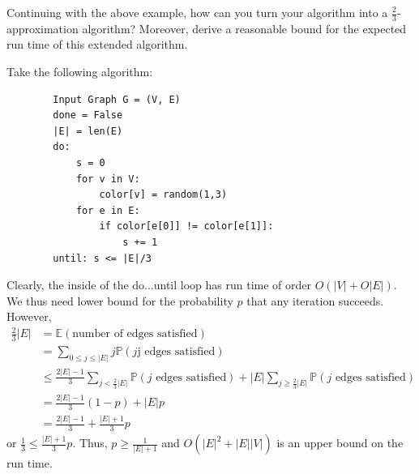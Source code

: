 \documentclass{article}
\begin{document}
\begin{exercise}
    Continuing with the above example, how can you turn your algorithm into a $\frac23$-approximation algorithm? Moreover, derive a reasonable bound for the expected run time of this extended algorithm.
\end{exercise}
\begin{solving}
    Take the following algorithm:
    \begin{verbatim}
        Input Graph G = (V, E)
        done = False
        |E| = len(E)
        do:
            s = 0
            for v in V:
                color[v] = random(1,3)
            for e in E:
                if color[e[0]] != color[e[1]]:
                    s += 1
        until: s <= |E|/3
    \end{verbatim}
    Clearly, the inside of the do...until loop has run time of order $O(|V|+ O|E|)$. We thus need lower bound for the probability $p$ that any iteration succeeds. However,\begin{equation*}
        \begin{split}
            \frac23 |E| &= \mathbb E(\text{number of edges satisfied})\\
            & = \sum_{0\leq j\leq |E|} j \mathbb P(j \text{j edges satisfied})\\
            & \leq \frac{2|E|-1}3 \sum_{j<\frac 23|E|}\mathbb P(j \text{ edges satisfied}) + |E| \sum_{j\geq \frac23 |E|}\mathbb P(j \text{ edges satisfied})\\
            &=  \frac{2|E|-1}3 (1-p) + |E|p\\
            & = \frac{2|E|-1}3 + \frac{|E|+ 1}3p
        \end{split} 
    \end{equation*}
    or $\frac13\leq \frac{|E|+ 1}3p $. Thus, $p \geq \frac1{|E|+1}$ and $O(|E|^2 + |E||V|)$ is an upper bound on the run time.
\end{solving}
\end{document}
